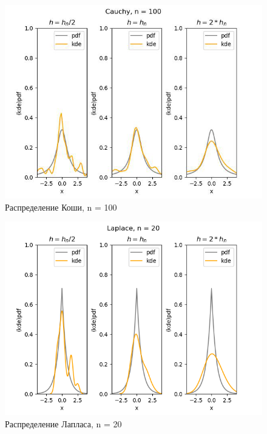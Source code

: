 \documentclass[../body.tex]{subfiles}
\begin{document}
\begin{figure}[H]
	\centering
	\includegraphics[width=\textwidth, height =0.4\textheight]{img/CauchyKDE n = 100.png}
	\caption{Распределение Коши, n = 100}
	\label{fig:cauchy_kde_100}
\end{figure}

\begin{figure}[H]
	\centering
	\includegraphics[width=\textwidth, height =0.4\textheight]{img/LaplaceKDE n = 20.png}
	\caption{Распределение Лапласа, n = 20}
	\label{fig:laplace_kde_20}
\end{figure}
\end{document}
